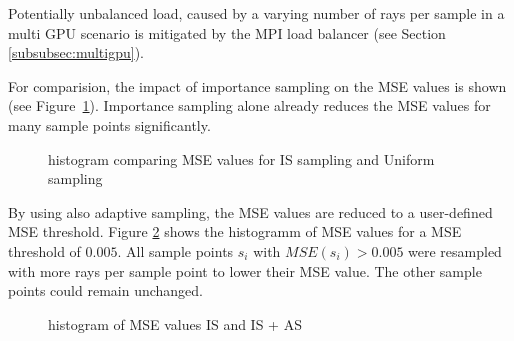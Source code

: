 Potentially unbalanced load, caused by a varying number of rays per sample 
in a multi GPU scenario is mitigated by the MPI load balancer (see Section
\ref{subsubsec:multigpu}).

For comparision, the impact of importance sampling
on the MSE values is shown (see Figure~\ref{plot:importance2}). 
Importance sampling alone already reduces the MSE values for
many sample points significantly.
\begin{figure}[H]
  \centerline{
    }
  \caption{histogram comparing MSE values for IS sampling and Uniform sampling}
  \label{plot:importance2}
\end{figure}
By using also adaptive sampling, the MSE values are reduced to a user-defined MSE threshold.
Figure \ref{plot:adaptive} shows the histogramm of MSE values for a MSE threshold
of $0.005$. All sample points $s_i$ with $MSE(s_i) > 0.005$ were resampled with more rays
per sample point to lower their MSE value. The other sample points could remain unchanged.
\begin{figure}[H]
  \centerline{
    }
  \caption{histogram of MSE values IS and IS + AS}
  \label{plot:adaptive}
\end{figure}
